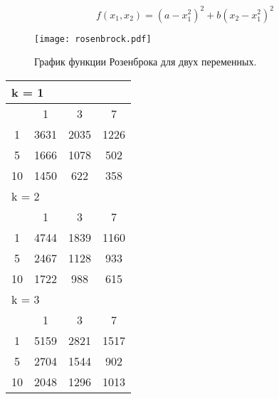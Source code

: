 \begin{equation}
\label{rosenbrock_eq}
f(x_1, x_2) = (a - x_1^2)^2 + b(x_2 - x_1^2)^2
\end{equation}


\begin{figure}
    \centering
    \texttt{[image: rosenbrock.pdf]}
    \caption{График функции Розенброка для двух переменных.}
    \label{rosenbrock_plot}
\end{figure}

\begin{table}
 \begin{tabular}{|*4{c|}}
\hline
\multicolumn{4}{|l|}{k = 1} \\
\hline
\multirow{1}{*}{\diagbox{$\mu$}{$\lambda$}} & \multicolumn{1}{c|}{1} & \multicolumn{1}{c|}{3} & \multicolumn{1}{c|}{7} \\
\hline
1 & 3631 & 2035 & 1226 \\
\hline
5 & 1666 & 1078 & 502 \\
\hline
10 & 1450 & 622 & 358 \\
\hline
\multicolumn{4}{|l|}{k = 2} \\
\hline
\multirow{1}{*}{\diagbox{$\mu$}{$\lambda$}} & \multicolumn{1}{c|}{1} & \multicolumn{1}{c|}{3} & \multicolumn{1}{c|}{7} \\
\hline
1 & 4744 & 1839 & 1160 \\
\hline
5 & 2467 & 1128 & 933 \\
\hline
10 & 1722 & 988 & 615 \\
\hline
\multicolumn{4}{|l|}{k = 3} \\
\hline
\multirow{1}{*}{\diagbox{$\mu$}{$\lambda$}} & \multicolumn{1}{c|}{1} & \multicolumn{1}{c|}{3} & \multicolumn{1}{c|}{7} \\
\hline
1 & 5159 & 2821 & 1517 \\
\hline
5 & 2704 & 1544 & 902 \\
\hline
10 & 2048 & 1296 & 1013 \\
\hline
\end{tabular}
\end{table}

